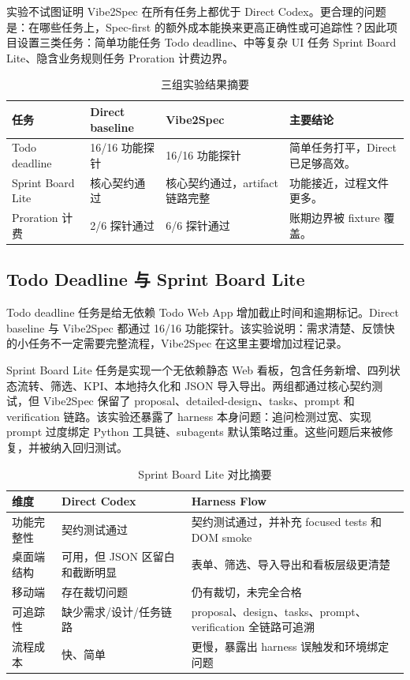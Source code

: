 \documentclass[11pt,a4paper]{article}
\begin{document}
实验不试图证明 Vibe2Spec 在所有任务上都优于 Direct Codex。更合理的问题是：在哪些任务上，Spec-first 的额外成本能换来更高正确性或可追踪性？因此项目设置三类任务：简单功能任务 Todo deadline、中等复杂 UI 任务 Sprint Board Lite、隐含业务规则任务 Proration 计费边界。

\begin{table}[htbp]
\centering
\caption{三组实验结果摘要}
\label{tab:experiments}
\begin{tabular}{P{0.23\textwidth}P{0.22\textwidth}P{0.22\textwidth}P{0.23\textwidth}}
\toprule
任务 & Direct baseline & Vibe2Spec & 主要结论 \\
\midrule
Todo deadline & 16/16 功能探针 & 16/16 功能探针 & 简单任务打平，Direct 已足够高效。 \\
Sprint Board Lite & 核心契约通过 & 核心契约通过，artifact 链路完整 & 功能接近，过程文件更多。 \\
Proration 计费 & 2/6 探针通过 & 6/6 探针通过 & 账期边界被 fixture 覆盖。 \\
\bottomrule
\end{tabular}
\end{table}

\subsection{Todo Deadline 与 Sprint Board Lite}

Todo deadline 任务是给无依赖 Todo Web App 增加截止时间和逾期标记。Direct baseline 与 Vibe2Spec 都通过 16/16 功能探针。该实验说明：需求清楚、反馈快的小任务不一定需要完整流程，Vibe2Spec 在这里主要增加过程记录。

Sprint Board Lite 任务是实现一个无依赖静态 Web 看板，包含任务新增、四列状态流转、筛选、KPI、本地持久化和 JSON 导入导出。两组都通过核心契约测试，但 Vibe2Spec 保留了 proposal、detailed-design、tasks、prompt 和 verification 链路。该实验还暴露了 harness 本身问题：追问检测过宽、实现 prompt 过度绑定 Python 工具链、subagents 默认策略过重。这些问题后来被修复，并被纳入回归测试。

\begin{table}[htbp]
\centering
\caption{Sprint Board Lite 对比摘要}
\label{tab:sprint}
\begin{tabular}{P{0.22\textwidth}P{0.30\textwidth}P{0.30\textwidth}}
\toprule
维度 & Direct Codex & Harness Flow \\
\midrule
功能完整性 & 契约测试通过 & 契约测试通过，并补充 focused tests 和 DOM smoke \\
桌面端结构 & 可用，但 JSON 区留白和截断明显 & 表单、筛选、导入导出和看板层级更清楚 \\
移动端 & 存在裁切问题 & 仍有裁切，未完全合格 \\
可追踪性 & 缺少需求/设计/任务链路 & proposal、design、tasks、prompt、verification 全链路可追溯 \\
流程成本 & 快、简单 & 更慢，暴露出 harness 误触发和环境绑定问题 \\
\bottomrule
\end{tabular}
\end{table}
\end{document}
